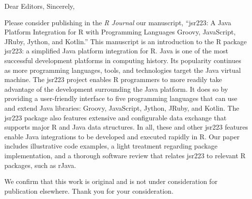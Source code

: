 \documentclass[11pt,signature,logo]{BYUstatletter}
\begin{document}
\begin{myletter}
{}
{}
{Dear Editors,}
{Sincerely,}

Please consider publishing in the \emph{R Journal} our manuscript, ``jsr223: A
Java Platform Integration for R with Programming Languages Groovy, JavaScript,
JRuby, Jython, and Kotlin.'' This manuscript is an introduction to the R
package jsr223: a simplified Java platform integration for R. Java is one of
the most successful development platforms in computing history. Its popularity
continues as more programming languages, tools, and technologies target the
Java virtual machine. The jsr223 project enables R programmers to more readily
take advantage of the development surrounding the Java platform. It does so by
providing a user-friendly interface to five programming languages that can use
and extend Java libraries: Groovy, JavaScript, Jython, JRuby, and Kotlin. The
jsr223 package also features extensive and configurable data exchange that
supports major R and Java data structures. In all, these and other jsr223
features enable Java integrations to be developed and executed rapidly in R.
Our paper includes illustrative code examples, a light treatment regarding
package implementation, and a thorough software review that relates jsr223 to
relevant R packages, such as rJava.

We confirm that this work is original and is not under consideration for
publication elsewhere.  Thank you for your consideration.

\end{myletter}
\end{document}
